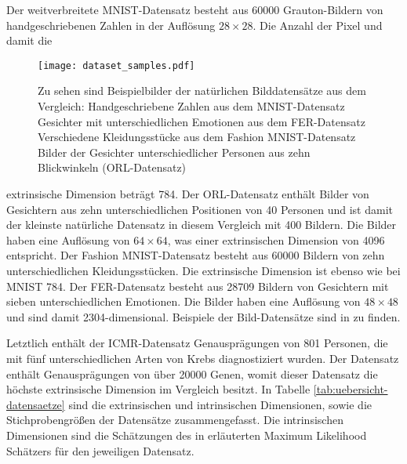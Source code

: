 Der weitverbreitete MNIST-Datensatz besteht aus \num{60000} Grauton-Bildern von handgeschriebenen
Zahlen in der Auflösung $28 \times 28$. Die Anzahl der Pixel und damit die
\begin{figure}[h]
	\begin{center}
		\texttt{[image: dataset\_samples.pdf]}
	\end{center}
	\caption[Beispielbilder der natürlichen Datensätze]{Zu sehen sind Beispielbilder der natürlichen Bilddatensätze aus dem Vergleich: \captiona Handgeschriebene Zahlen aus dem MNIST-Datensatz \captionb Gesichter mit unterschiedlichen Emotionen aus dem FER-Datensatz \captionc Verschiedene Kleidungsstücke aus dem Fashion MNIST-Datensatz \captiond Bilder der Gesichter unterschiedlicher Personen aus zehn Blickwinkeln (ORL-Datensatz)}
	\label{fig:Dataset_samples}
\end{figure}
extrinsische Dimension beträgt 784. Der ORL-Datensatz enthält Bilder von Gesichtern aus
zehn unterschiedlichen Positionen von 40 Personen und ist damit der kleinste natürliche Datensatz
in diesem Vergleich mit 400 Bildern. Die Bilder haben eine Auflösung von $64 \times 64$, was einer
extrinsischen Dimension von \num{4096} entspricht. Der Fashion MNIST-Datensatz besteht aus \num{60000} Bildern
von zehn unterschiedlichen Kleidungsstücken. Die extrinsische Dimension ist ebenso wie bei MNIST
784. Der FER-Datensatz besteht aus \num{28 709} Bildern von Gesichtern mit sieben unterschiedlichen
Emotionen. Die Bilder haben eine Auflösung von $48 \times 48$ und sind damit \num{2304}-dimensional.
Beispiele der Bild-Datensätze sind in  zu finden.


Letztlich enthält der ICMR-Datensatz Genausprägungen von 801 Personen, die mit fünf
unterschiedlichen Arten von Krebs diagnostiziert wurden. Der Datensatz enthält Genausprägungen von
über \num{20000} Genen, womit dieser Datensatz die höchste extrinsische Dimension im Vergleich
besitzt. In Tabelle \ref{tab:uebersicht-datensaetze} sind die extrinsischen und intrinsischen
Dimensionen, sowie die Stichprobengrößen der Datensätze zusammengefasst. Die intrinsischen
Dimensionen sind die Schätzungen des in
 erläuterten Maximum
Likelihood Schätzers für den jeweiligen Datensatz.


